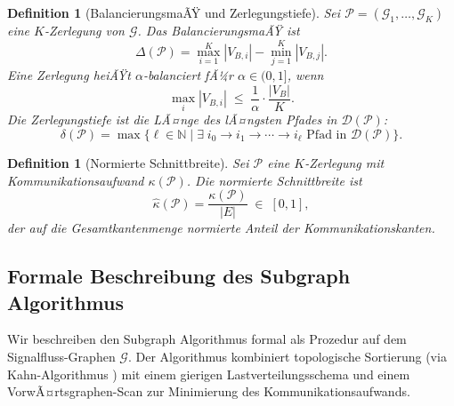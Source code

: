 ﻿\documentclass[12pt,a4paper]{article}
\newtheorem{definition}[theorem]{Definition}
\theoremstyle{definition}
\begin{document}
\begin{definition}[BalancierungsmaÃŸ und Zerlegungstiefe]
\label{def:balance}
Sei $\mathcal{P} = (\mathcal{G}_1, \ldots, \mathcal{G}_K)$ eine $K$-Zerlegung
von $\mathcal{G}$. Das \emph{BalancierungsmaÃŸ} ist
\[
  \Delta(\mathcal{P}) = \max_{i=1}^K |V_{B,i}| - \min_{j=1}^K |V_{B,j}|.
\]
Eine Zerlegung heiÃŸt \emph{$\alpha$-balanciert} fÃ¼r $\alpha \in (0,1]$, wenn
\[
  \max_{i} |V_{B,i}| \;\leq\; \frac{1}{\alpha} \cdot \frac{|V_B|}{K}.
\]
Die \emph{Zerlegungstiefe} ist die LÃ¤nge des lÃ¤ngsten Pfades in
$\mathcal{D}(\mathcal{P})$:
\[
  \delta(\mathcal{P}) = \max\bigl\{\ell \in \mathbb{N} \;\big|\;
    \exists\; i_0 \to i_1 \to \cdots \to i_\ell
    \text{ Pfad in } \mathcal{D}(\mathcal{P})\bigr\}.
\]
\end{definition}

\begin{definition}[Normierte Schnittbreite]
\label{def:edgecut}
Sei $\mathcal{P}$ eine $K$-Zerlegung mit Kommunikationsaufwand $\kappa(\mathcal{P})$.
Die \emph{normierte Schnittbreite} ist
\[
  \hat{\kappa}(\mathcal{P}) = \frac{\kappa(\mathcal{P})}{|E|} \;\in\; [0,1],
\]
der auf die Gesamtkantenmenge normierte Anteil der Kommunikationskanten.
\end{definition}

\subsection{Formale Beschreibung des Subgraph Algorithmus}
\label{subsec:subgraph-alg}

Wir beschreiben den Subgraph Algorithmus \cite{subgraph2026} formal als
Prozedur auf dem Signalfluss-Graphen $\mathcal{G}$. Der Algorithmus
kombiniert topologische Sortierung (via Kahn-Algorithmus \cite{kahn1962})
mit einem gierigen Lastverteilungsschema und einem VorwÃ¤rtsgraphen-Scan
zur Minimierung des Kommunikationsaufwands.
\end{document}

